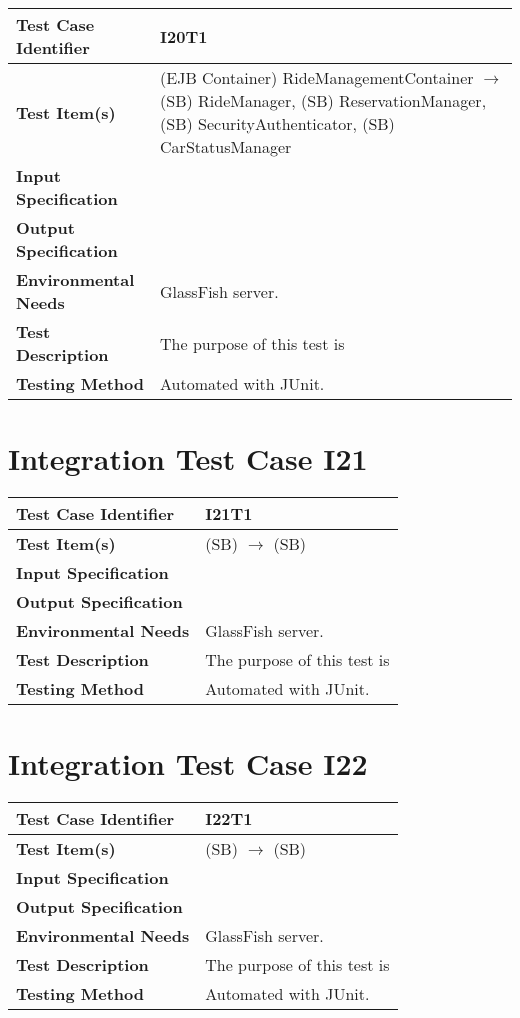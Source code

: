 \begin{longtable}{p{} | p{}}
\hline
\textbf{Test Case Identifier} & I20T1\\
\hline
\textbf{Test Item(s)} & (EJB Container) RideManagementContainer $\rightarrow$ (SB) RideManager, (SB) ReservationManager, (SB) SecurityAuthenticator, (SB) CarStatusManager \\
\hline
\textbf{Input Specification} &  \\
\hline
\textbf{Output Specification} &  \\
\hline
\textbf{Environmental Needs} & GlassFish server. \\
\hline
\textbf{Test Description} & The purpose of this test is  \\
\hline
\textbf{Testing Method} & Automated with JUnit. \\
\hline
\end{longtable}

\section{Integration Test Case I21}

\begin{longtable}{p{} | p{}}
\hline
\textbf{Test Case Identifier} & I21T1\\
\hline
\textbf{Test Item(s)} & (SB)  $\rightarrow$ (SB)  \\
\hline
\textbf{Input Specification} &  \\
\hline
\textbf{Output Specification} &  \\
\hline
\textbf{Environmental Needs} & GlassFish server. \\
\hline
\textbf{Test Description} & The purpose of this test is  \\
\hline
\textbf{Testing Method} & Automated with JUnit. \\
\hline
\end{longtable}

\section{Integration Test Case I22}

\begin{longtable}{p{} | p{}}
\hline
\textbf{Test Case Identifier} & I22T1\\
\hline
\textbf{Test Item(s)} & (SB)  $\rightarrow$ (SB)  \\
\hline
\textbf{Input Specification} &  \\
\hline
\textbf{Output Specification} &  \\
\hline
\textbf{Environmental Needs} & GlassFish server. \\
\hline
\textbf{Test Description} & The purpose of this test is  \\
\hline
\textbf{Testing Method} & Automated with JUnit. \\
\hline
\end{longtable}

